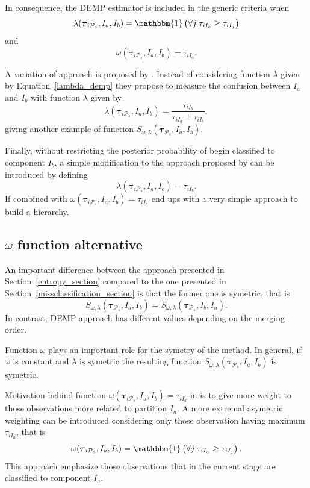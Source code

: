 \documentclass[submit]{smj}
\theoremstyle{definition}
\newcommand{\m}[1]{\boldsymbol{#1}}
\begin{document}
In consequence, the DEMP estimator is included in the generic criteria when
\begin{equation}\label{lambda_demp}
\lambda(\m\tau_{i \mathcal{P}_s},  I_a,  I_b) = \mathbbm{1}\left( \forall j\; \tau_{i I_{b}} \geq \tau_{iI_j} \right)
\end{equation}
and
\[
\omega(\m\tau_{i \mathcal{P}_s},  I_a,  I_b) =  \tau_{iI_a}.
\]

A variation of \cite{hennig2010methods} approach is proposed by \cite{longford2014}. Instead of considering function $\lambda$ given by Equation~\ref{lambda_demp} they propose to measure the confusion between $I_a$ and $I_b$ with function $\lambda$ given by
\[
\lambda(\m\tau_{i \mathcal{P}_s},  I_a,  I_b) = \frac{\tau_{iI_b}}{\tau_{iI_a} + \tau_{iI_b}},
\]
giving another example of function $S_{\omega, \lambda}( \m\tau_{\mathcal{P}_s},  I_a,  I_b)$.

Finally, without restricting  the posterior probability of begin classified to component $I_b$, a simple modification to the approach proposed by \cite{longford2014} can be introduced by defining
\[
\lambda(\m\tau_{i \mathcal{P}_s},  I_a,  I_b) = \tau_{iI_b}.
\]
If combined with $\omega(\m\tau_{i \mathcal{P}_s},  I_a,  I_b) =  \tau_{iI_a}$ end ups with a very simple approach to build a hierarchy.

\subsection{$\omega$ function alternative}


An important difference between the approach presented in Section~\ref{entropy_section} \citep{baudry2010combining} compared to the one presented in Section~\ref{missclassification_section} \citep{hennig2010methods} is that the former one is symetric, that is
\[
S_{\omega, \lambda}( \m\tau_{\mathcal{P}_s},  I_a,  I_b) = S_{\omega, \lambda}( \m\tau_{\mathcal{P}_s},  I_b,  I_a).
\]
In contrast, DEMP approach has different values depending on the merging order.

Function $\omega$ plays an important role for the symetry of the method. In general, if $\omega$ is constant and $\lambda$ is symetric the resulting function $S_{\omega, \lambda}( \m\tau_{\mathcal{P}_s},  I_a,  I_b)$ is symetric.

Motivation behind function $\omega(\m\tau_{i \mathcal{P}_s},  I_a,  I_b) = \tau_{iI_a}$ in \cite{hennig2010methods} is to give more weight to those observations more related to partition $I_a$. A more extremal asymetric weighting can be introduced considering only those observation having maximum $ \tau_{iI_a}$, that is
\[
\omega(\m\tau_{i \mathcal{P}_s},  I_a,  I_b) = \mathbbm{1}\left( \forall j\; \tau_{i I_{a}} \geq \tau_{iI_j} \right).
\]
This approach emphasize those observations that in the current stage are classified to component $I_a$.
\end{document}
